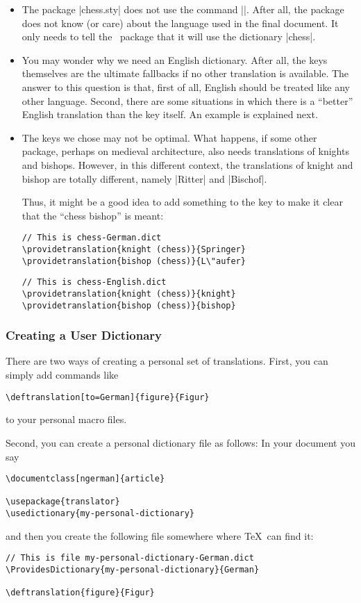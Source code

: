 \begin{itemize}
  \item The package |chess.sty| does not use the command |\uselanguage|. After all, the package does not know (or care) about the language used in the final document. It only needs to tell the \translatorname\ package that it will use the dictionary |chess|.
  \item You may wonder why we need an English dictionary. After all, the keys themselves are the ultimate fallbacks if no other translation is available. The answer to this question is that, first of all, English should be treated like any other language. Second, there are some situations in which there is a ``better'' English translation than the key itself. An example is explained next.
  \item The keys we chose may not be optimal. What happens, if some other package, perhaps on medieval architecture, also needs translations of knights and bishops. However, in this different context, the translations of knight and bishop are totally different, namely |Ritter| and |Bischof|.

  Thus, it might be a good idea to add something to the key to make it clear that the ``chess bishop'' is meant:
\begin{verbatim}
// This is chess-German.dict
\providetranslation{knight (chess)}{Springer}
\providetranslation{bishop (chess)}{L\"aufer}
\end{verbatim}

\begin{verbatim}
// This is chess-English.dict
\providetranslation{knight (chess)}{knight}
\providetranslation{bishop (chess)}{bishop}
\end{verbatim}
\end{itemize}

\subsubsection{Creating a User Dictionary}

There are two ways of creating a personal set of translations. First, you can simply add commands like
\begin{verbatim}
\deftranslation[to=German]{figure}{Figur}
\end{verbatim}
to your personal macro files.

Second, you can create a personal dictionary file as follows: In your document you say
\begin{verbatim}
\documentclass[ngerman]{article}

\usepackage{translator}
\usedictionary{my-personal-dictionary}
\end{verbatim}
and then you create the following file somewhere where \TeX\ can find it:
\begin{verbatim}
// This is file my-personal-dictionary-German.dict
\ProvidesDictionary{my-personal-dictionary}{German}

\deftranslation{figure}{Figur}
\end{verbatim}

